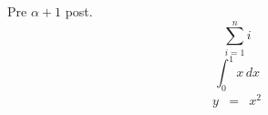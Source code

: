 \documentclass{article}
\begin{document}
Pre \(\alpha+1\) post.
\begin{displaymath}
\sum_{i=1}^n i
\end{displaymath}
\[\int_0^1 x\,dx\]
\begin{eqnarray*}
y &=& x^2
\end{eqnarray*}
\end{document}
